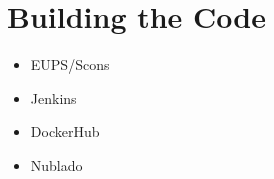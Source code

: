\section{Building the Code}
\begin{itemize}
\item EUPS/Scons
\item Jenkins
\item DockerHub
\item Nublado
\end{itemize}
